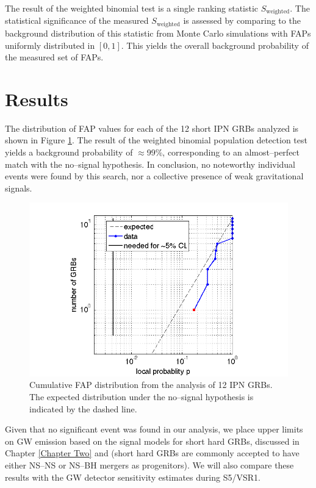 The result of the weighted binomial test is a single ranking statistic  $S_\text{weighted}$.  The statistical significance of the measured $S_\text{weighted}$ is assessed by comparing to the background distribution of this statistic from Monte Carlo simulations with FAPs uniformly distributed in $[0,1]$. This yields the overall background  probability of the measured set of FAPs.

\section{Results}
\label{sec:results}

The distribution of FAP values for each of the 12 short IPN GRBs analyzed is shown in Figure \ref{fig:binomialTestCBC}. The result of the weighted binomial population detection test yields a background probability of $\approx$99\%, corresponding to an almost--perfect match with the no--signal hypothesis. In conclusion, no noteworthy individual events were found by this search, nor a collective presence of weak gravitational signals.

\begin{figure}[htb]
\centering
\includegraphics[width=28pc]{Images/binomial_test.png}
\caption{Cumulative FAP distribution from
the analysis of 12 IPN GRBs. The expected
distribution under the no--signal hypothesis is indicated by the
dashed line.}
\label{fig:binomialTestCBC}
\end{figure}

Given that no significant event was found in our analysis, we place upper limits on GW emission based on the signal models for short hard GRBs, discussed in Chapter \ref{Chapter Two} and \cite{lvc:s6grb} (short hard GRBs are commonly accepted to have either NS--NS or NS--BH mergers as progenitors). We will also compare these results with the GW detector sensitivity estimates during S5/VSR1.

